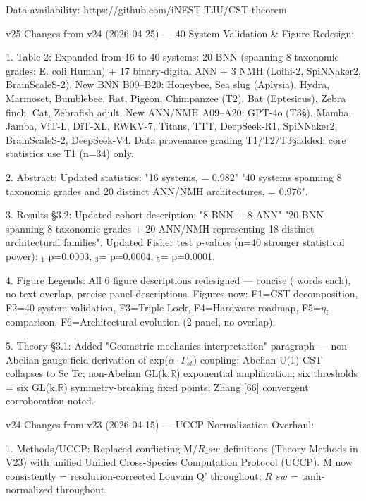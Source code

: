 \documentclass[a4paper,12pt]{article}
\providecommand{\textsubscript}[1]{\ensuremath{_{\text{#1}}}}
\begin{document}
Data availability: https://github.com/iNEST-TJU/CST-theorem

v25 Changes from v24 (2026-04-25) --- 40-System Validation \& Figure Redesign:

1.
Table 2: Expanded from 16 to 40 systems: 20 BNN (spanning 8 taxonomic grades: E. coli  \rightarrow  Human) + 17 binary-digital ANN + 3 NMH (Loihi-2, SpiNNaker2, BrainScaleS-2).
New BNN B09--B20: Honeybee, Sea slug (Aplysia), Hydra, Marmoset, Bumblebee, Rat, Pigeon, Chimpanzee (T2\dag), Bat (Eptesicus), Zebra finch, Cat, Zebrafish adult.
New ANN/NMH A09--A20: GPT-4o (T3\S), Mamba, Jamba, ViT-L, DiT-XL, RWKV-7, Titans, TTT, DeepSeek-R1, SpiNNaker2, BrainScaleS-2, DeepSeek-V4.
Data provenance grading T1/T2\dag/T3\S added; core statistics use T1 (n=34) only.

2. Abstract: Updated statistics: "16 systems,  \rho  = 0.982"  \rightarrow  "40 systems spanning 8 taxonomic grades and 20 distinct ANN/NMH architectures,  \rho  = 0.976".

3. Results \S3.2: Updated cohort description: "8 BNN + 8 ANN"  \rightarrow  "20 BNN spanning 8 taxonomic grades + 20 ANN/NMH representing 18 distinct architectural families". Updated Fisher test p-values (n=40 stronger statistical power):  \theta \textsubscript{1} p=0.0003,  \theta \textsubscript{3}= \phi  p=0.0004,  \theta \textsubscript{5}= \pi  p=0.0001.

4. Figure Legends: All 6 figure descriptions redesigned --- concise (  words each), no text overlap, precise panel descriptions. Figures now: F1=CST decomposition, F2=40-system validation, F3=Triple Lock, F4=Hardware roadmap, F5=$\eta_{\text{I}}$ comparison, F6=Architectural evolution (2-panel, no overlap).

5. Theory \S3.1: Added "Geometric mechanics interpretation" paragraph --- non-Abelian gauge field derivation of exp($\alpha \cdot \Gamma_{st}$) coupling; Abelian U(1)  \rightarrow  CST collapses to Sc \cdot Tc; non-Abelian GL(k,$\mathbb{R}$)  \rightarrow  exponential amplification; six thresholds = six GL(k,$\mathbb{R}$) symmetry-breaking fixed points; Zhang [66] convergent corroboration noted.

v24 Changes from v23 (2026-04-15) --- UCCP Normalization Overhaul:

1. Methods/UCCP: Replaced conflicting M/$R\_{sw}$ definitions (Theory  \neq  Methods in V23) with unified Unified Cross-Species Computation Protocol (UCCP). M now consistently = resolution-corrected Louvain Q' throughout; $R\_{sw}$ = tanh-normalized  \sigma  throughout.
\end{document}
